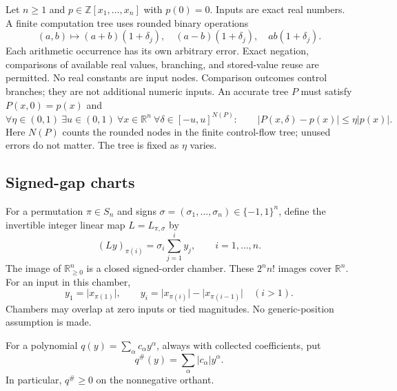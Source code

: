 \documentclass[11pt,a4paper]{article}
\theoremstyle{definition}
\theoremstyle{remark}
\newcommand{\R}{\mathbb R}
\newcommand{\Z}{\mathbb Z}
\newcommand{\abs}[1]{\lvert #1\rvert}
\newcommand{\maj}[1]{#1^{\#}}
\begin{document}
Let $n\ge1$ and $p\in\Z[x_1,\ldots,x_n]$ with $p(0)=0$. Inputs are exact real
numbers. A finite computation tree uses rounded binary operations
\[
 (a,b)\longmapsto (a+b)(1+\delta_j),\quad
 (a-b)(1+\delta_j),\quad ab(1+\delta_j).
\]
Each arithmetic occurrence has its own arbitrary error. Exact negation,
comparisons of available real values, branching, and stored-value reuse are
permitted. No real constants are input nodes. Comparison outcomes control
branches; they are not additional numeric inputs.
An accurate tree $P$ must satisfy $P(x,0)=p(x)$ and
\begin{equation}\label{eq:accuracy}
 \forall\eta\in(0,1)\ \exists u\in(0,1)\ \forall x\in\R^n\
 \forall\delta\in[-u,u]^{N(P)}:\qquad
 \abs{P(x,\delta)-p(x)}\le\eta\abs{p(x)}.
\end{equation}
Here $N(P)$ counts the rounded nodes in the finite control-flow tree; unused
errors do not matter. The tree is fixed as $\eta$ varies.

\subsection{Signed-gap charts}

For a permutation $\pi\in S_n$ and signs
$\sigma=(\sigma_1,\ldots,\sigma_n)\in\{-1,1\}^n$, define the invertible
integer linear map $L=L_{\pi,\sigma}$ by
\begin{equation}\label{eq:chart}
 (Ly)_{\pi(i)}=\sigma_i\sum_{j=1}^{i}y_j,
 \qquad i=1,\ldots,n.
\end{equation}
The image of $\R_{\ge0}^n$ is a closed signed-order chamber. These
$2^n n!$ images cover $\R^n$. For an input in this chamber,
\begin{equation}\label{eq:gaps}
 y_1=\abs{x_{\pi(1)}},\qquad
 y_i=\abs{x_{\pi(i)}}-\abs{x_{\pi(i-1)}}\quad (i>1).
\end{equation}
Chambers may overlap at zero inputs or tied magnitudes. No generic-position
assumption is made.

For a polynomial $q(y)=\sum_\alpha c_\alpha y^\alpha$, always with collected
coefficients, put
\begin{equation}\label{eq:majorant}
 \maj q(y)=\sum_\alpha\abs{c_\alpha}y^\alpha.
\end{equation}
In particular, $\maj q\ge0$ on the nonnegative orthant.
\end{document}
